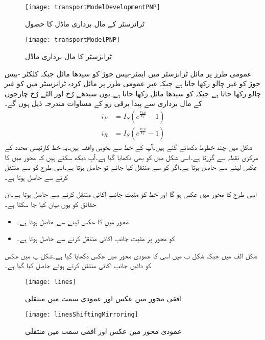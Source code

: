 \begin{figure}
\centering
\texttt{[image: transportModelDevelopmentPNP]}
\caption{ ٹرانزسٹر کے مال برداری ماڈل کا حصول}
\label{شکل_ٹرانزسٹر_کا_مال_برداری_ماڈل_کا_حصول_مثبت_منفی_مثبت}
\end{figure}
%
\begin{figure}
\centering
\texttt{[image: transportModelPNP]}
\caption{ ٹرانزسٹر کا مال برداری ماڈل}
\label{شکل_ٹرانزسٹر_کا_مال_برداری_ماڈل_مثبت_منفی_مثبت}
\end{figure}
عمومی طرز پر مائل ٹرانزسٹر میں ایمٹر-بیس جوڑ کو سیدھا مائل   جبکہ کلکٹر -بیس جوڑ کو غیر چالو رکھا جاتا ہے جبکہ غیر عمومی طرز پر مائل کردہ   ٹرانزسٹر میں   کو غیر چالو رکھا جاتا ہے جبکہ  کو سیدھا مائل رکھا جاتا ہے۔یوں سیدھے رُخ اور الٹے رُخ چارجوں کے مال برداری سے پیدا برقی رو کے مساوات مندرجہ ذیل ہوں گے۔
\begin{align}
i_F&=I_S \left (e^{\frac{v_{EB}}{V_T}}-1 \right )\\
i_R&=I_S \left(e^{\frac{v_{CB}}{V_T}}-1 \right )
\end{align}
شکل  میں چند خطوط دکھائے گئے ہیں۔آپ  کے خط سے بخوبی واقف ہیں۔یہ خط کارتیسی محدد کے مرکزی  نقطہ  سے گزرتا ہے۔اسی شکل میں  کو بھی دکھایا گیا ہے۔آپ دیکھ سکتے ہیں کہ  محور میں  کا  عکس لینے سے  حاصل ہوتا ہے۔اگر  کو  سے  منتقل کیا جائے تو  حاصل ہوتا ہے۔اسی طرح   کو  سے  منتقل کرنے سے  حاصل ہوتا ہے۔

اسی طرح   کا  محور میں عکس  ہو گا اور خط کو مثبت  جانب  اکائی منتقل کرنے سے  حاصل ہوتا ہے۔ان حقائق کو یوں بیان کیا جا سکتا ہے۔
\begin{itemize}
\item
{} محور میں   کا عکس لینے سے  حاصل ہوتا ہے۔
\item
{} کو  محور پر مثبت جانب  اکائی  منتقل کرنے سے  حاصل ہوتا ہے۔
\end{itemize} 
شکل  الف  میں  جبکہ شکل ب میں اسی کا عمودی محور میں عکس  دکھایا گیا ہے۔شکل پ میں عکس کو دائیں جانب  اکائی منتقل کرتے ہوئے  حاصل کیا گیا ہے۔
%
\begin{figure}
\centering
\texttt{[image: lines]}
\caption{افقی محور میں عکس اور عمودی سمت میں منتقلی}
\label{شکل_ٹرانزسٹر_افقی_عکس_عمودی_منتقلی}
\end{figure}
%
\begin{figure}
\centering
\texttt{[image: linesShiftingMirroring]}
\caption{عمودی محور میں عکس اور افقی سمت میں منتقلی}
\label{شکل_ٹرانزسٹر_عمودی_عکس_افقی_منتقلی}
\end{figure}
%

